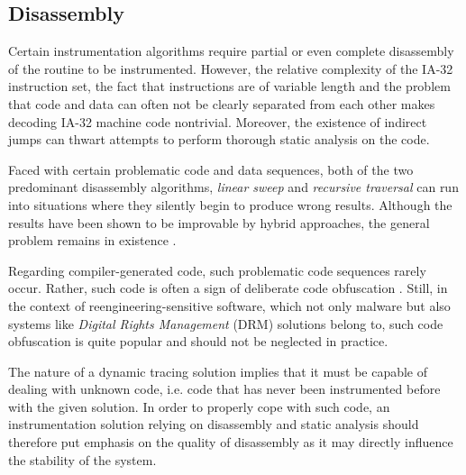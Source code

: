\subsection{Disassembly}
\label{sec:Disassembly}
Certain instrumentation algorithms require partial or even complete disassembly of 
the routine to be instrumented. However, the relative complexity of the IA-32 instruction set,
the fact that instructions are of variable length and the problem that code and 
data can often not be clearly separated from each other makes decoding IA-32 machine 
code nontrivial. Moreover, the existence of indirect jumps can thwart attempts
to perform thorough static analysis on the code. 

Faced with certain problematic code and data sequences, both of the two predominant
disassembly algorithms, \emph{linear sweep} and \emph{recursive traversal} can run into
situations where they silently begin to produce wrong results. Although the results
have been shown to be improvable by hybrid approaches, the general problem remains
in existence \cite{schwarz02disassembly}. 

Regarding compiler-generated code, such problematic code sequences rarely occur. Rather,
such code is often a sign of deliberate code obfuscation \cite{Eilam05}. Still,
in the context of reengineering-sensitive software, which not only malware but also
systems like \emph{Digital Rights Management} (DRM) solutions belong to, such code 
obfuscation is quite popular and should not be neglected in practice.

The nature of a dynamic tracing solution implies that it must be capable
of dealing with unknown code, i.e. code that has never been instrumented before with
the given solution. In order to properly cope with such code, an instrumentation 
solution relying on disassembly and static analysis should therefore put 
emphasis on the quality of disassembly as it may directly influence the stability 
of the system. 



